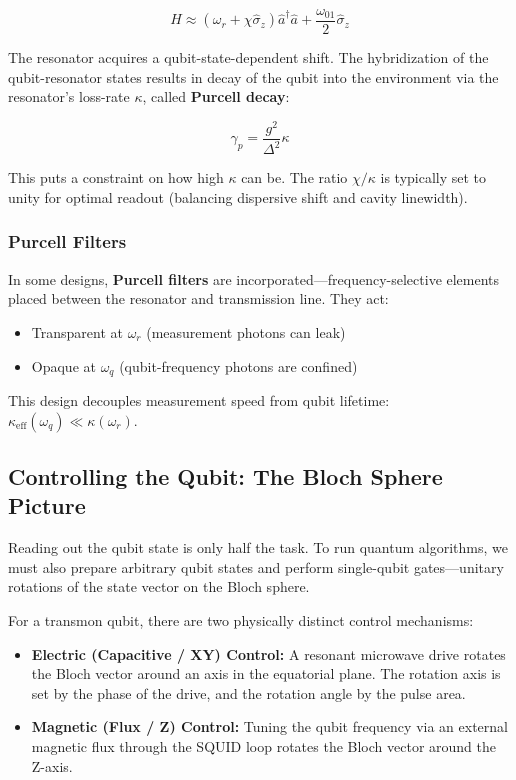 \documentclass{article}
\begin{document}
$$H \approx (\omega_r + \chi \hat{\sigma}_z) \hat{a}^\dagger \hat{a} + \frac{\omega_{01}}{2} \hat{\sigma}_z$$

The resonator acquires a qubit-state-dependent shift. The hybridization of the qubit-resonator states results in decay of the qubit into the environment via the resonator's loss-rate $\kappa$, called \textbf{Purcell decay}:

$$\gamma_p = \frac{g^2}{\Delta^2} \kappa$$

This puts a constraint on how high $\kappa$ can be. The ratio $\chi / \kappa$ is typically set to unity for optimal readout (balancing dispersive shift and cavity linewidth).

\subsubsection*{Purcell Filters}

In some designs, \textbf{Purcell filters} are incorporated—frequency-selective elements placed between the resonator and transmission line. They act:
\begin{itemize}
    \item Transparent at $\omega_r$ (measurement photons can leak)
    \item Opaque at $\omega_q$ (qubit-frequency photons are confined)
\end{itemize}

This design decouples measurement speed from qubit lifetime: $\kappa_{\text{eff}}(\omega_q) \ll \kappa(\omega_r)$.

\subsection{Controlling the Qubit: The Bloch Sphere Picture}

Reading out the qubit state is only half the task. To run quantum algorithms, we must also prepare arbitrary qubit states and perform single-qubit gates—unitary rotations of the state vector on the Bloch sphere.

For a transmon qubit, there are two physically distinct control mechanisms:

\begin{itemize}
    \item \textbf{Electric (Capacitive / XY) Control:} A resonant microwave drive rotates the Bloch vector around an axis in the equatorial plane. The rotation axis is set by the phase of the drive, and the rotation angle by the pulse area.
    \item \textbf{Magnetic (Flux / Z) Control:} Tuning the qubit frequency via an external magnetic flux through the SQUID loop rotates the Bloch vector around the Z-axis.
\end{itemize}
\end{document}
